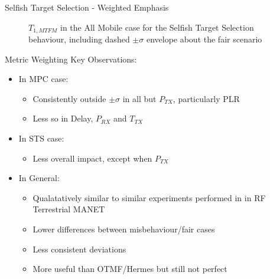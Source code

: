 \documentclass{beamer}
\begin{document}
\begin{frame}{Selfish Target Selection - Weighted Emphasis}
\begin{figure}[h]
\caption{$T_{1,MTFM}$ in the All Mobile case for the Selfish Target Selection behaviour, including dashed $\pm\sigma$ envelope about the fair scenario\hyperlink{fig:selfish_emph_closeup}{}}
 
\label{fig:all_mobile_selfish}
\end{figure}
\end{frame}

\begin{frame}{Metric Weighting}
  Key Observations:
  \begin{itemize}
    \item In MPC case:
      \begin{itemize}
        \item Consistently outside $\pm\sigma$ in all but $P_{TX}$, particularly PLR
        \item Less so in Delay, $P_{RX}$ and $T_{TX}$
      \end{itemize}
    \item In STS case:
      \begin{itemize}
        \item Less overall impact, except when $P_{TX}$
      \end{itemize}

    \item In General:
      \begin{itemize}
        \item Qualatatively similar to similar experiments performed in \autocite{Guo11} in RF Terrestrial MANET
        \item Lower differences between misbehaviour/fair cases
        \item Less consistent deviations
        \item More useful than OTMF/Hermes but still not perfect
      \end{itemize}
  \end{itemize}

\end{frame}
\end{document}
